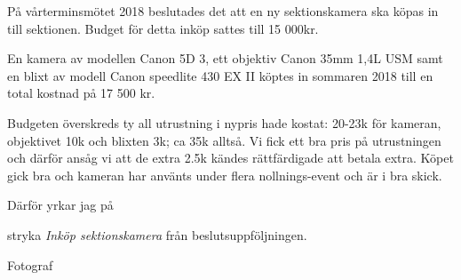 \documentclass[../_main/handlingar.tex]{subfiles}
\begin{document}

På vårterminsmötet 2018 beslutades det att en ny sektionskamera ska köpas in till sektionen. Budget för detta inköp sattes till 15 000kr.

En kamera av modellen Canon 5D 3, ett objektiv Canon 35mm 1,4L USM samt en blixt av modell Canon speedlite 430 EX II  köptes in sommaren 2018 till en total kostnad på 17 500 kr. 

Budgeten överskreds ty all utrustning i nypris hade kostat: 20-23k för kameran, objektivet 10k och blixten 3k; ca 35k alltså. Vi fick ett bra pris på utrustningen och därför ansåg vi att de extra 2.5k kändes rättfärdigade att betala extra. Köpet gick bra och kameran har använts under flera nollnings-event och är i bra skick. 

Därför yrkar jag på
\begin{attsatser}
    \att stryka \emph{Inköp sektionskamera} från beslutsuppföljningen.
\end{attsatser}

\begin{signatures}{1}
    \mvh
    \signature{Eltayeb Bayomi}{Fotograf}
\end{signatures}
\end{document}
